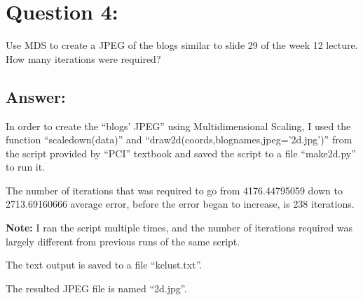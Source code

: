 \documentclass[a4paper, 11pt]{article}
\begin{document}
\section*{Question 4:}
Use MDS to create a JPEG of the blogs similar to slide 29 of the week 12 lecture.  How many iterations were required?

\subsection*{Answer:}
In order to create the ``blogs' JPEG'' using Multidimensional Scaling, I used the function ``scaledown(data)'' and ``draw2d(coords,blognames,jpeg='2d.jpg')'' from the script provided by ``PCI'' textbook and saved the script to a file ``make2d.py'' to run it. 



The number of iterations that was required to go from 4176.44795059 down to 2713.69160666 average error, before the error began to increase, is 238 iterations.

\textbf{Note:}
I ran the script multiple times, and the number of iterations required was largely different from previous runs of the same script.   

The text output is saved to a file ``kclust.txt''.

The resulted JPEG file is named ``2d.jpg''.
\end{document}
